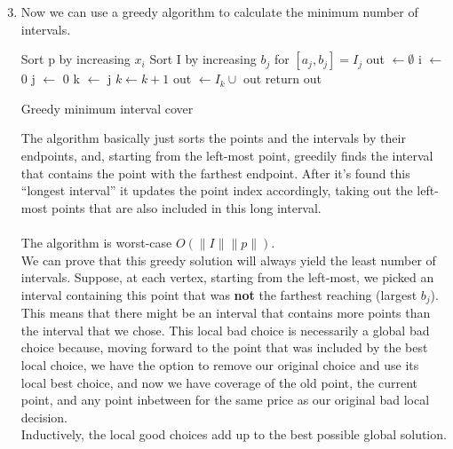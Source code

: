 
\usepackage{amsmath, verbatim, tikz, float, pgfplots, framed}
\usepackage[]{algorithm2e}

\usetikzlibrary{arrows,automata}

\oddsidemargin 0in
\evensidemargin 0in
\textwidth 6.5in
\topmargin -0.5in
\textheight 9.0in
\newcommand{\norm}[1]{\left\lVert #1 \right\rVert}


\pagestyle{myheadings}

\begin{enumerate}
  \setcounter{enumi}{2}
\item
  Now we can use a greedy algorithm to calculate the minimum number of intervals.\\
  \begin{framed}
    \begin{algorithm}[H]      
      Sort p by increasing $x_i$\;
      Sort I by increasing $b_j$ for $[a_j,b_j] = I_j$\;
      out $\gets \emptyset$\;
      i $\gets$ 0\;
      j $\gets$ 0\;
       {
        k $\gets$ j\;
         {
          $k \gets k+1$
        }
        out $\gets I_k \cup$ out\;
      }
      return out\;
      \caption{Greedy minimum interval cover}
    \end{algorithm}
  \end{framed}

  The algorithm basically just sorts the points and the intervals by their endpoints, and, starting from the left-most point, greedily finds the interval that contains the point with the farthest endpoint. After it's found this ``longest interval'' it updates the point index accordingly, taking out the left-most points that are also included in this long interval.\\\\
  The algorithm is worst-case $O(\|I\|\|p\|)$.\\
  
  We can prove that this greedy solution will always yield the least number of intervals. Suppose, at each vertex, starting from the left-most, we picked an interval containing this point that was \textbf{not} the farthest reaching (largest $b_j$). This means that there might be an interval that contains more points than the interval that we chose. This local bad choice is necessarily a global bad choice because, moving forward to the point that was included by the best local choice, we have the option to remove our original choice and use its local best choice, and now we have coverage of the old point, the current point, and any point inbetween for the same price as our original bad local decision.\\
  Inductively, the local good choices add up to the best possible global solution.
  
\end{enumerate}
